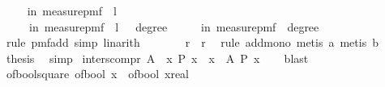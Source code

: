 \begin{isabellebody}
\isanewline
\ \ \isamarkupfalse%
\ {\isachardoublequoteopen}{\isasymP}{\isacharparenleft}{\kern0pt}{\isasymomega}\ in\ measure{\isacharunderscore}{\kern0pt}pmf\ {\isasymOmega}{\isachardot}{\kern0pt}\ {\isacharquery}{\kern0pt}l\ {\isasymomega}{\isacharparenright}{\kern0pt}\ {\isasymle}\isanewline
\ \ \ \ {\isasymP}{\isacharparenleft}{\kern0pt}{\isasymomega}\ in\ measure{\isacharunderscore}{\kern0pt}pmf\ {\isasymOmega}{\isachardot}{\kern0pt}\ {\isacharquery}{\kern0pt}l\ {\isasymomega}\ {\isasymand}\ degree\ {\isasymomega}\ {\isasymge}\ {}{\isacharparenright}{\kern0pt}\ {\isacharplus}{\kern0pt}\ {\isasymP}{\isacharparenleft}{\kern0pt}{\isasymomega}\ in\ measure{\isacharunderscore}{\kern0pt}pmf\ {\isasymOmega}{\isachardot}{\kern0pt}\ degree\ {\isasymomega}\ {\isacharless}{\kern0pt}\ {}{\isacharparenright}{\kern0pt}{\isachardoublequoteclose}\isanewline
\ \ \ \ \isamarkupfalse%
\ {\isacharparenleft}{\kern0pt}rule\ pmf{\isacharunderscore}{\kern0pt}add{\isacharcomma}{\kern0pt}\ simp{\isacharcomma}{\kern0pt}\ linarith{\isacharparenright}{\kern0pt}\isanewline
\ \ \isamarkupfalse%
\ \isamarkupfalse%
\ {\isachardoublequoteopen}{\isachardot}{\kern0pt}{\isachardot}{\kern0pt}{\isachardot}{\kern0pt}\ {\isasymle}\ {\isacharquery}{\kern0pt}r{}\ {\isacharplus}{\kern0pt}\ {\isacharquery}{\kern0pt}r{}{\isachardoublequoteclose}\ \isamarkupfalse%
\ {\isacharparenleft}{\kern0pt}rule\ add{\isacharunderscore}{\kern0pt}mono{\isacharcomma}{\kern0pt}\ metis\ a{\isacharcomma}{\kern0pt}\ metis\ b{\isacharparenright}{\kern0pt}\isanewline
\ \ \isamarkupfalse%
\ \isamarkupfalse%
\ {\isacharquery}{\kern0pt}thesis\ \isamarkupfalse%
\ simp\isanewline
{}\isamarkupfalse%
%
\endisatagproof
{\isafoldproof}%
%
\isadelimproof
\isanewline
%
\endisadelimproof
\isanewline
{}\isamarkupfalse%
\ inters{\isacharunderscore}{\kern0pt}compr{\isacharcolon}{\kern0pt}\ {\isachardoublequoteopen}A\ {\isasyminter}\ {\isacharbraceleft}{\kern0pt}x{\isachardot}{\kern0pt}\ P\ x{\isacharbraceright}{\kern0pt}\ {\isacharequal}{\kern0pt}\ {\isacharbraceleft}{\kern0pt}x\ {\isasymin}\ A{\isachardot}{\kern0pt}\ P\ x{\isacharbraceright}{\kern0pt}{\isachardoublequoteclose}\isanewline
%
\isadelimproof
\ \ %
\endisadelimproof
%
\isatagproof
{}\isamarkupfalse%
\ blast%
\endisatagproof
{\isafoldproof}%
%
\isadelimproof
\isanewline
%
\endisadelimproof
\isanewline
{}\isamarkupfalse%
\ of{\isacharunderscore}{\kern0pt}bool{\isacharunderscore}{\kern0pt}square{\isacharcolon}{\kern0pt}\ {\isachardoublequoteopen}{\isacharparenleft}{\kern0pt}of{\isacharunderscore}{\kern0pt}bool\ x{\isacharparenright}{\kern0pt}\ {\isacharequal}{\kern0pt}\ {\isacharparenleft}{\kern0pt}{\isacharparenleft}{\kern0pt}of{\isacharunderscore}{\kern0pt}bool\ x{\isacharparenright}{\kern0pt}{\isacharcolon}{\kern0pt}{\isacharcolon}{\kern0pt}real{\isacharparenright}{\kern0pt}{\isachardoublequoteclose}\isanewline

\end{isabellebody}
